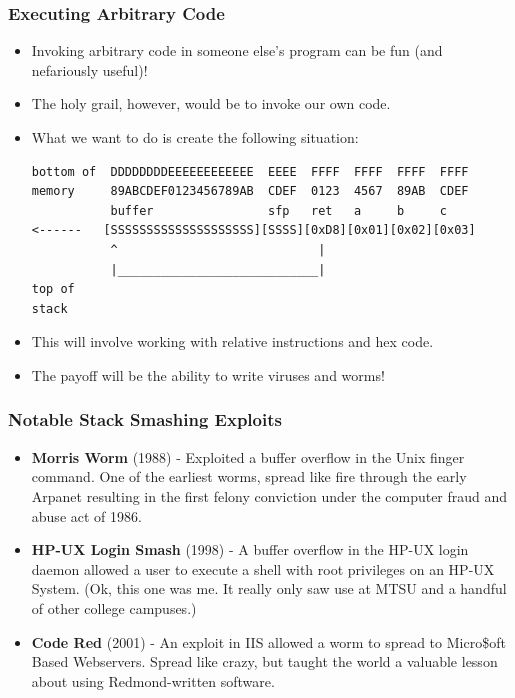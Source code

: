\documentclass{beamer}
\begin{document}
\begin{frame}[fragile]
    \frametitle{Executing Arbitrary Code}
    \begin{itemize}
        \item Invoking arbitrary code in someone else's program can be fun (and nefariously useful)!
        \item The holy grail, however, would be to invoke our own code.  
        \item What we want to do is create the following situation:
        {\scriptsize
        \begin{verbatim}
bottom of  DDDDDDDDEEEEEEEEEEEE  EEEE  FFFF  FFFF  FFFF  FFFF
memory     89ABCDEF0123456789AB  CDEF  0123  4567  89AB  CDEF
           buffer                sfp   ret   a     b     c
<------   [SSSSSSSSSSSSSSSSSSSS][SSSS][0xD8][0x01][0x02][0x03]
           ^                            |
           |____________________________|
top of                                    
stack                                    
\end{verbatim}
        }
        \item This will involve working with relative instructions and hex code.
        \item The payoff will be the ability to write viruses and worms!
    \end{itemize}
\end{frame}

\begin{frame}
    \frametitle{Notable Stack Smashing Exploits}
    \begin{itemize}[<+->]
        \item {\bf Morris Worm} (1988) - Exploited a buffer overflow in the Unix finger command.  One of the earliest worms, spread like fire through the early Arpanet resulting in the first felony conviction under the computer fraud and abuse act of 1986.
        \item {\bf HP-UX Login Smash} (1998) - A buffer overflow in the HP-UX login daemon allowed a user to execute a shell with root privileges on an HP-UX System.  (Ok, this one was me.  It really only saw use at MTSU and a handful of other college campuses.)
        \item {\bf Code Red} (2001) - An exploit in IIS allowed a worm to spread to Micro\$oft Based Webservers.  Spread like crazy, but taught the world a valuable lesson about using Redmond-written software.
    \end{itemize}
\end{frame}
\end{document}
